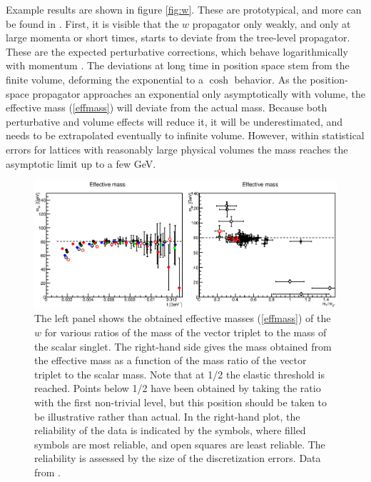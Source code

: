 \documentclass[final,twoside,12pt]{article}
\newcommand*{\pref}[1]{(\ref{#1})}
\newcommand*{\1}{1\!\!\!\bot}
\begin{document}
Example results are shown in figure \ref{fig:w}. These are prototypical, and more can be found in  \cite{Maas:2013aia,Maas:unpublished,Maas:2012tj,Maas:2010nc}. First, it is visible that the $w$ propagator only weakly, and only at large momenta or short times, starts to deviate from the tree-level propagator. These are the expected perturbative corrections, which behave logarithmically with momentum \cite{Bohm:2001yx}. The deviations at long time in position space stem from the finite volume, deforming the exponential to a $\cosh$ behavior. As the position-space propagator approaches an exponential only asymptotically with volume, the effective mass \pref{effmass} will deviate from the actual mass. Because both perturbative and volume effects will reduce it, it will be underestimated, and needs to be extrapolated eventually to infinite volume. However, within statistical errors for lattices with reasonably large physical volumes the mass reaches the asymptotic limit up to a few GeV.

\begin{figure}
\includegraphics[width=\linewidth]{w-mass}
\caption{\label{fig:wmass}The left panel shows the obtained effective masses \pref{effmass} of the $w$ for various ratios of the mass of the vector triplet to the mass of the scalar singlet. The right-hand side gives the mass obtained from the effective mass as a function of the mass ratio of the vector triplet to the scalar mass. Note that at 1/2 the elastic threshold is reached. Points below 1/2 have been obtained by taking the ratio with the first non-trivial level, but this position should be taken to be illustrative rather than actual. In the right-hand plot, the reliability of the data is indicated by the symbols, where filled symbols are most reliable, and open squares are least reliable. The reliability is assessed by the size of the discretization errors. Data from \cite{Maas:2013aia,Maas:unpublished}.}
\end{figure}
\end{document}
